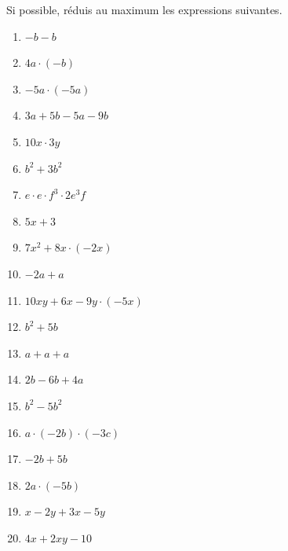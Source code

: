%
%
	Si possible, réduis au maximum les expressions suivantes.
	\begin{enumerate}[cols=3]
		\item \(-b -b\)
		\item \(4a \cdot (-b)\)
		\item \(-5a\cdot (-5a)\)
		\item \(3a + 5b - 5a - 9b\)
		\item \(10x \cdot 3y\)
		\item \(b^2 + 3b^2\)
		\item \(e \cdot e \cdot f^3 \cdot 2e^3f\)
		\item \(5x + 3\)
		\item \(7x^2 + 8x \cdot (-2x)\)
		\item \(-2a + a \)
		\item \(10xy + 6x - 9y \cdot (-5x)\)
		\item \(b^2 + 5b\)
		\item \(a + a + a \)
		\item \(2b - 6b + 4a\)
		\item \(b^2 - 5b^2\)
		\item \(a \cdot (-2b)\cdot (-3c)\)
		\item \(-2b + 5b\)
		\item \(2a \cdot (-5b)\)
		\item \(x-2y + 3x - 5y\)
		\item \(4x + 2xy - 10\)
	\end{enumerate}
